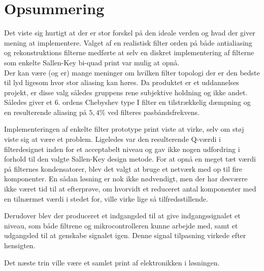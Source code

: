 \section{Opsummering}

Det viste sig hurtigt at der er stor forskel på den ideale verden og hvad der giver mening at implementere.
Valget af en realistisk filter orden på både antialiasing og rekonstruktions filterne medførte at selv en diskret implementering af filterne som enkelte Sallen-Key bi-quad print var mulig at opnå.
\\
Der kan være (og er) mange meninger om hvilken filter topologi der er den bedste til lyd ligesom hvor stor aliasing kan høres.
Da produktet er et uddannelses projekt, er disse valg således gruppens rene subjektive holdning og ikke andet.
Således giver et 6. ordens Chebyshev type I filter en tilstrækkelig dæmpning og en resulterende aliasing på  $5,4\si\percent$ ved filteres pasbåndsfrekvens. 

Implementeringen af enkelte filter prototype print viste at virke, selv om støj viste sig at være et problem.
Ligeledes var den resulterende Q-værdi i filterdesignet inden for et acceptabelt niveau og gav ikke nogen udfordring i forhold til den valgte Sallen-Key design metode. 
For at opnå en meget tæt værdi på filternes kondensatorer, blev det valgt at bruge et netværk med op til fire komponenter.
En sådan løsning er nok ikke nødvendigt, men der har desværre ikke været tid til at efterprøve, om hvorvidt et reduceret antal komponenter med en tilnærmet værdi i stedet for, ville virke lige så tilfredsstillende.

Derudover blev der produceret et indgangsled til at give indgangssignalet et niveau, som både filtrene og mikrocontrolleren kunne arbejde med, samt et udgangsled til at genskabe signalet igen.
Denne signal tilpasning virkede efter hensigten.

Det næste trin ville være et samlet print af elektronikken i løsningen.